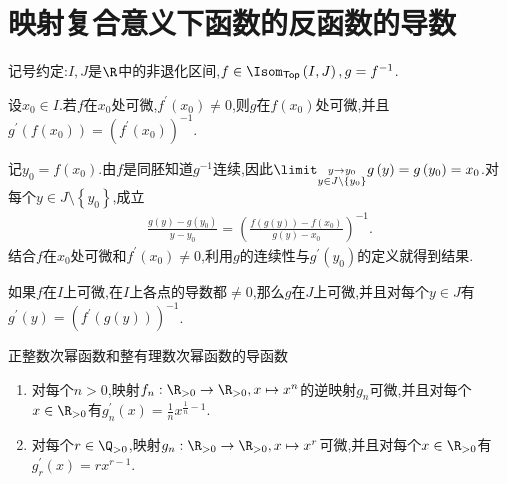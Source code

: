 \section{映射复合意义下函数的反函数的导数}

记号约定:$I,J$是$\R$中的非退化区间,$f\in\Isom_{\mathsf{Top}}\left(I,J\right),g=f^{-1}$.

\begin{proposition}{}{}
	设$x_{0}\in I$.若$f$在$x_{0}$处可微,$f^{\prime}\left(x_{0}\right)\neq 0$,则$g$在$f\left(x_{0}\right)$处可微,并且$g^{\prime}\left(f\left(x_{0}\right)\right)=\left(f^{\prime}\left(x_{0}\right)\right)^{-1}$.
\end{proposition}

\begin{sketch}{}{}
	记$y_{0}=f\left(x_{0}\right)$.由$f$是同胚知道$g^{-1}$连续,因此$\limit_{\substack{y\to y_{0}\\ y\in J\setminus\left\{y_{0}\right\}}}g\left(y\right)=g\left(y_{0}\right)=x_{0}$.对每个$y\in J\setminus\left\{y_{0}\right\}$,成立
	\begin{align*}
		\frac{g\left(y\right)-g\left(y_{0}\right)}{y-y_{0}}=\left(\frac{f\left(g\left(y\right)\right)-f\left(x_{0}\right)}{g\left(y\right)-x_{0}}\right)^{-1}.
	\end{align*}
	结合$f$在$x_{0}$处可微和$f^{\prime}\left(x_{0}\right)\neq 0$,利用$g$的连续性与$g^{\prime}\left(y_{0}\right)$的定义就得到结果.
\end{sketch}

\begin{corollary}{}{}
	如果$f$在$I$上可微,在$I$上各点的导数都$\neq 0$,那么$g$在$J$上可微,并且对每个$y\in J$有$g^{\prime}\left(y\right)=\left(f^{\prime}\left(g\left(y\right)\right)\right)^{-1}$.
\end{corollary}

\begin{example}{正整数次幂函数和整有理数次幂函数的导函数}{}
	\begin{enumerate}
		\item 对每个$n>0$,映射$f_{n}:\R_{>0}\to\R_{>0},x\mapsto x^{n}$的逆映射$g_{n}$可微,并且对每个$x\in\R_{>0}$有$g_{n}^{\prime}\left(x\right)=\frac{1}{n}x^{\frac{1}{n}-1}$.
		\item 对每个$r\in\Q_{>0}$,映射$g_{n}:\R_{>0}\to\R_{>0},x\mapsto x^{r}$可微,并且对每个$x\in\R_{>0}$有$g_{r}^{\prime}\left(x\right)=rx^{r-1}$.
	\end{enumerate}
\end{example}









